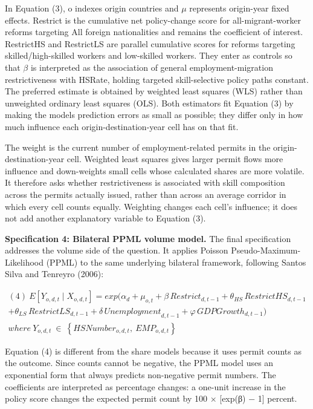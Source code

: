 \documentclass[11pt,a4paper]{article}
\begin{document}
In Equation (3), o indexes origin countries and \(\mu\) represents
origin-year fixed effects. Restrict is the cumulative net policy-change
score for all-migrant-worker reforms targeting All foreign nationalities
and remains the coefficient of interest. RestrictHS and RestrictLS are
parallel cumulative scores for reforms targeting skilled/high-skilled
workers and low-skilled workers. They enter as controls so that
\(\beta\) is interpreted as the association of general
employment-migration restrictiveness with HSRate, holding targeted
skill-selective policy paths constant. The preferred estimate is
obtained by weighted least squares (WLS) rather than unweighted ordinary
least squares (OLS). Both estimators fit Equation (3) by making the
model\textquotesingle s prediction errors as small as possible; they
differ only in how much influence each origin-destination-year cell has
on that fit.

The weight is the current number of employment-related permits in the
origin-destination-year cell. Weighted least squares gives larger permit
flows more influence and down-weights small cells whose calculated
shares are more volatile. It therefore asks whether restrictiveness is
associated with skill composition across the permits actually issued,
rather than across an average corridor in which every cell counts
equally. Weighting changes each cell's influence; it does not add
another explanatory variable to Equation (3).

\textbf{Specification 4: Bilateral PPML volume model.} The final
specification addresses the volume side of the question. It applies
Poisson Pseudo-Maximum-Likelihood (PPML) to the same underlying
bilateral framework, following Santos Silva and Tenreyro (2006):

\[\begin{array}{r}
(4)\ E\left\lbrack Y_{o,d,t} \mid X_{o,d,t} \right\rbrack = exp(\alpha_{d} + \mu_{o,t} + \beta\,{Restrict}_{d,t - 1} + \theta_{HS}\,{RestrictHS}_{d,t - 1} \\
 + \theta_{LS}\,{RestrictLS}_{d,t - 1} + \delta\,{Unemployment}_{d,t - 1} + \varphi\,{GDPGrowth}_{d,t - 1}) \\
where\ Y_{o,d,t}\  \in \ \left\{ {HSNumber}_{o,d,t},\ {EMP}_{o,d,t} \right\}
\end{array}\]

Equation (4) is different from the share models because it uses permit
counts as the outcome. Since counts cannot be negative, the PPML model
uses an exponential form that always predicts non-negative permit
numbers. The coefficients are interpreted as percentage changes: a
one-unit increase in the policy score changes the expected permit count
by 100 × {[}exp(β) − 1{]} percent.
\end{document}
